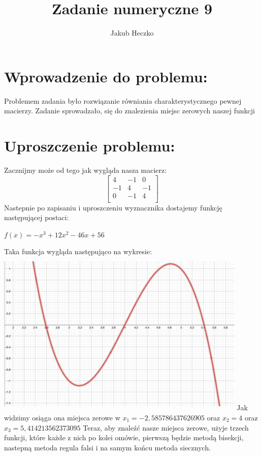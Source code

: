\documentclass[12pt]{article}
\begin{document}
\title{{\Large}Zadanie numeryczne 9}
\date{}
\author{Jakub Heczko}

\maketitle

\section{Wprowadzenie do problemu: }
Problemem zadania było rozwiązanie równiania charakterystycznego pewnej macierzy. Zadanie sprowadzało, się do znalezienia miejsc zerowych naszej funkcji
\section{Uproszczenie problemu: }
Zacznijmy może od tego jak wygląda nasza macierz:
\[
\begin{bmatrix}
    4 & -1 & 0 \\
    -1 & 4 & -1 \\ 
    0 & -1 & 4 \\
\end{bmatrix}
\]
Nastepnie po zapisaniu i uproszczeniu wyznacznika dostajemy funkcję następującej postaci:
\begin{center}
    \begin{math}
        f(x) = -x^{3}+12x^{2}-46x+56
    \end{math}
\end{center}
Taka funkcja wygląda następująco na wykresie:
\newline
\includegraphics[width=12cm,height=8cm, keepaspectratio]{wykres_funkcja.png}
\newline
Jak widzimy osiąga ona miejsca zerowe w $x_{1} = -2,585786437626905$ oraz $x_{2} = 4$ oraz $x_{3} = 5,414213562373095$
\newline
Teraz, aby znaleźć nasze miejsca zerowe, użyje trzech funkcji, które każde z nich po kolei omówie, pierwszą będzie metodą bisekcji, nastepną metoda regula falsi i na samym końcu metoda siecznych. 
\end{document}
